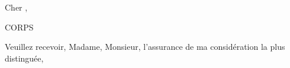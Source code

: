 \documentclass[11pt]{letter}
\begin{document}
\begin{letter}{%
}

\opening{Cher ,}

CORPS

\closing{Veuillez recevoir, Madame, Monsieur, l'assurance de ma considération la plus distinguée,}

\end{letter}
\end{document}
